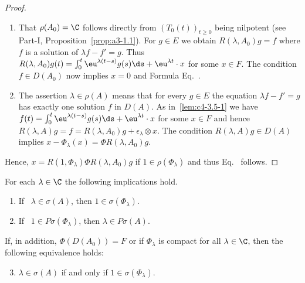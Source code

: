 \begin{proof}
\begin{enumerate}[\upshape (i), wide, labelindent=.25em] 
    \item 
    That $\rho(A_{0}) = \C$ follows directly from $(T_{0}(t))_{t \geq 0}$ being nilpotent (see Part-I, Proposition~\ref{prop:a3-1.1}). For $g \in E$ we obtain $R(\lambda,A_{0})g = f$ where $f$ is a solution of\/ $\lambda f - f' = g$.
    Thus $R(\lambda,A_{0})g(t) = \int_{0}^{t} \eu^{\lambda(t-s)}g(s)\ds + \eu^{\lambda t} \cdot x$ for some $x \in F$. The condition $f \in D(A_{0})$ now implies $x = 0$ and Formula Eq.~.
    
    \item 
    The assertion $\lambda \in \rho(A)$ means that for every $g \in E$ the equation $\lambda f - f' = g$ has exactly one solution $f$ in $D(A)$. As in~\ref{lem:c4-3.5-1} we have 
    $f(t) = \int_{0}^{t} \eu^{\lambda(t-s)}g(s)\ds + \eu^{\lambda t} \cdot x$ for some $x \in F$ and hence
    $R(\lambda,A)g = f = R(\lambda,A_{0})g + \epsilon_{\lambda}  \otimes x$. 
    The condition $R(\lambda,A)g \in D(A)$ implies $x - \Phi_{\lambda}(x) = \Phi R(\lambda,A_{0})g$. 
\end{enumerate}    
    Hence, $x = R(1,\Phi_{\lambda})\Phi R(\lambda,A_{0})g$ if\/ $1 \in \rho(\Phi_{\lambda})$ and thus Eq.~ follows.
\end{proof}
\begin{proposition}\label{prop:c4-3.6}
For each $\lambda \in \C$ the following implications hold.
\begin{enumerate}[\upshape (i)]
\item \label{prop:c4-3.6-1}
If \, $\lambda \in \sigma(A)$, then $1 \in \sigma(\Phi_{\lambda})$.
\item \label{prop:c4-3.6-2}
If \, $1 \in P\sigma(\Phi_{\lambda})$, then $\lambda \in P\sigma(A)$.
\end{enumerate}
If, in addition, $\Phi(D(A_{0})) = F$ or if\/ $\Phi_{\lambda}$ is compact for all $\lambda \in \C$, then the following equivalence holds:
\begin{enumerate}[\upshape (i)]
\setcounter{enumi}{2}
\item \label{prop:c4-3.6-3}
$\lambda \in \sigma(A)$ if and only if\/ $1 \in \sigma(\Phi_{\lambda})$.
\end{enumerate}
\end{proposition}
